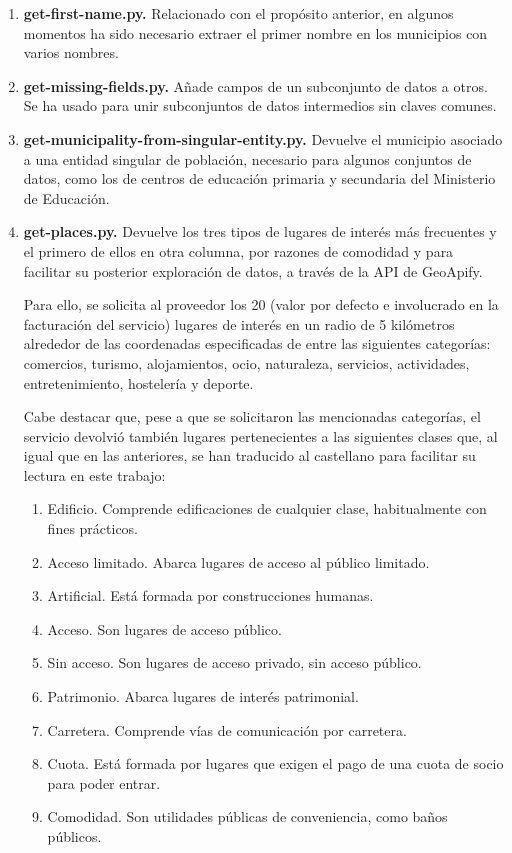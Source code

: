 \begin{enumerate}
    \item \textbf{get-first-name.py.} Relacionado con el propósito anterior, en algunos momentos ha sido necesario extraer el primer nombre en los municipios con varios nombres.
    
    \item \textbf{get-missing-fields.py.} Añade campos de un subconjunto de datos a otros. Se ha usado para unir subconjuntos de datos intermedios sin claves comunes.
    
    \item \textbf{get-municipality-from-singular-entity.py.} Devuelve el municipio asociado a una entidad singular de población, necesario para algunos conjuntos de datos, como los de centros de educación primaria y secundaria del Ministerio de Educación.
    
    \item \textbf{get-places.py.} Devuelve los tres tipos de lugares de interés más frecuentes y el primero de ellos en otra columna, por razones de comodidad y para facilitar su posterior exploración de datos, a través de la API de GeoApify.

    Para ello, se solicita al proveedor los 20 (valor por defecto e involucrado en la facturación del servicio) lugares de interés en un radio de 5 kilómetros alrededor de las coordenadas especificadas de entre las siguientes categorías: comercios, turismo, alojamientos, ocio, naturaleza, servicios, actividades, entretenimiento, hostelería y deporte.

    Cabe destacar que, pese a que se solicitaron las mencionadas categorías, el servicio devolvió también lugares pertenecientes a las siguientes clases que, al igual que en las anteriores, se han traducido al castellano para facilitar su lectura en este trabajo:

    \begin{enumerate}
        \item Edificio. Comprende edificaciones de cualquier clase, habitualmente con fines prácticos.
        \item Acceso limitado. Abarca lugares de acceso al público limitado.
        \item Artificial. Está formada por construcciones humanas.
        \item Acceso. Son lugares de acceso público.
        \item Sin acceso. Son lugares de acceso privado, sin acceso público.
        \item Patrimonio. Abarca lugares de interés patrimonial.
        \item Carretera. Comprende vías de comunicación por carretera.
        \item Cuota. Está formada por lugares que exigen el pago de una cuota de socio para poder entrar.
        \item Comodidad. Son utilidades públicas de conveniencia, como baños públicos.
    \end{enumerate}
    

\end{enumerate}
